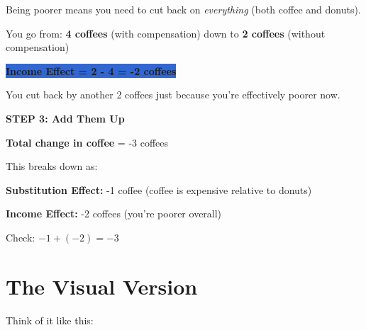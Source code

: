\documentclass[12pt]{article}
\begin{document}
Being poorer means you need to cut back on \textit{everything} (both coffee and donuts).

You go from: \textbf{4 coffees} (with compensation) down to \textbf{2 coffees} (without compensation)

\vspace{0.3cm}

\colorbox{highlight}{\textbf{Income Effect = 2 - 4 = -2 coffees}}

\vspace{0.3cm}

You cut back by another 2 coffees just because you're effectively poorer now.

\vspace{0.5cm}

\textbf{STEP 3: Add Them Up}

\begin{tcolorbox}[colback=green!10!white,colframe=green!75!black,title=The Slutsky Decomposition]
\textbf{Total change in coffee} = -3 coffees

\vspace{0.2cm}

This breaks down as:

\textbf{Substitution Effect:} -1 coffee (coffee is expensive relative to donuts)

\textbf{Income Effect:} -2 coffees (you're poorer overall)

\vspace{0.2cm}

Check: $-1 + (-2) = -3$ \checkmark
\end{tcolorbox}

\newpage

\section*{The Visual Version}

Think of it like this:

\vspace{0.3cm}
\end{document}
